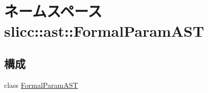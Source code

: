 \hypertarget{namespaceslicc_1_1ast_1_1FormalParamAST}{
\section{ネームスペース slicc::ast::FormalParamAST}
\label{namespaceslicc_1_1ast_1_1FormalParamAST}
}
\subsection*{構成}
\begin{DoxyCompactItemize}
\item 
class \hyperlink{classslicc_1_1ast_1_1FormalParamAST_1_1FormalParamAST}{FormalParamAST}
\end{DoxyCompactItemize}
